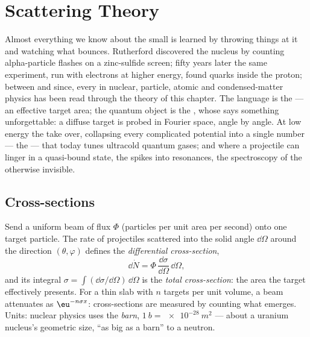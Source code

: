 \chapter{Scattering Theory}\label{ch:b3:scattering-theory}

Almost everything we know about the small is learned by throwing
things at it and watching what bounces. Rutherford discovered the
nucleus by counting alpha-particle flashes on a zinc-sulfide screen;
fifty years later the same experiment, run with electrons at higher
energy, found quarks inside the proton; between and since, every
 in nuclear, particle, atomic and condensed-matter
physics has been read through the theory of this chapter. The
language is the \emph{} --- an effective target area;
the quantum object is the \emph{}, whose  says something unforgettable: a diffuse target is
probed in Fourier space, angle by angle. At low energy the  take over, collapsing every complicated potential into a
single number --- the  --- that today tunes
ultracold quantum gases; and where a projectile can linger in a
quasi-bound state, the  spikes into resonances, the
spectroscopy of the otherwise invisible.

\section{Cross-sections}

\begin{definition}\label{def:b3:scattering-theory:cross-section}
Send a uniform beam of flux $\Phi$ (particles per unit area per
second) onto one target particle. The rate of projectiles scattered
into the solid angle $\dd\Omega$ around the direction $(\theta,
\varphi)$ defines the \emph{differential cross-section},
\[
\dd\dot N = \Phi\,\frac{\dd\sigma}{\dd\Omega}\,\dd\Omega ,
\]
and its integral $\sigma = \int(\dd\sigma/\dd\Omega)\,\dd\Omega$ is
the \emph{total cross-section}: the area the target effectively
presents. For a thin slab with $n$ targets per unit volume, a beam
attenuates as $\eu^{-n\sigma x}$: cross-sections are measured by
counting what emerges. Units: nuclear physics uses the \emph{barn},
$\qty{1}{b} = \qty{e-28}{m^2}$ --- about a uranium nucleus's
geometric size, ``as big as a barn'' to a neutron.
\end{definition}

